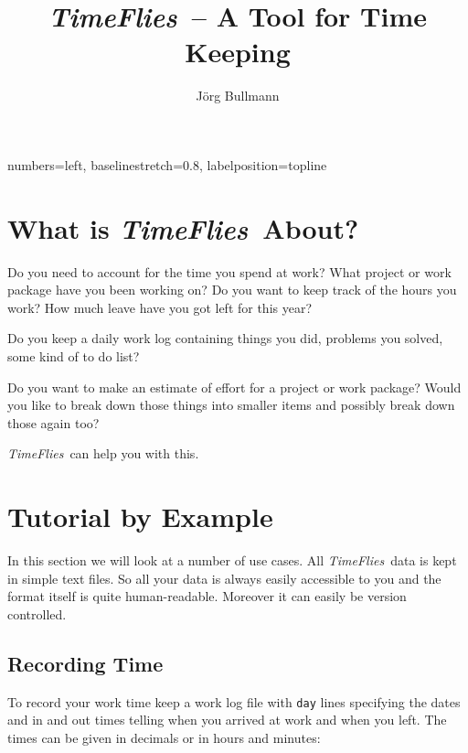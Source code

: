 \documentclass[11pt]{article}
\newcommand{\timeflies}{\emph{TimeFlies}}
\begin{document}
   {%
    numbers=left,
    baselinestretch=0.8,
    labelposition=topline}


\title{\timeflies\ -- A Tool for Time Keeping}
\author{J\"org Bullmann}
\maketitle
\tableofcontents
\newpage

\section{What is \timeflies\ About?}

Do you need to account for the time you spend at work? What project or work package have you been working on? Do you want to keep track of the hours you work? How much leave have you got left for this year?

Do you keep a daily work log containing things you did, problems you solved, some kind of to do list?

Do you want to make an estimate of effort for a project or work package? Would you like to break down those things into smaller items and possibly break down those again too?

\timeflies\ can help you with this.

\section{Tutorial by Example}

In this section we will look at a number of use cases. All \timeflies\ data is kept in simple text files. So all your data is always easily accessible to you and the format itself is quite human-readable. Moreover it can easily be version controlled.

\subsection{Recording Time}

To record your work time keep a work log file with \verb-day- lines specifying the dates and in and out times telling when you arrived at work and when you left. The times can be given in decimals or in hours and minutes:


\end{document}
